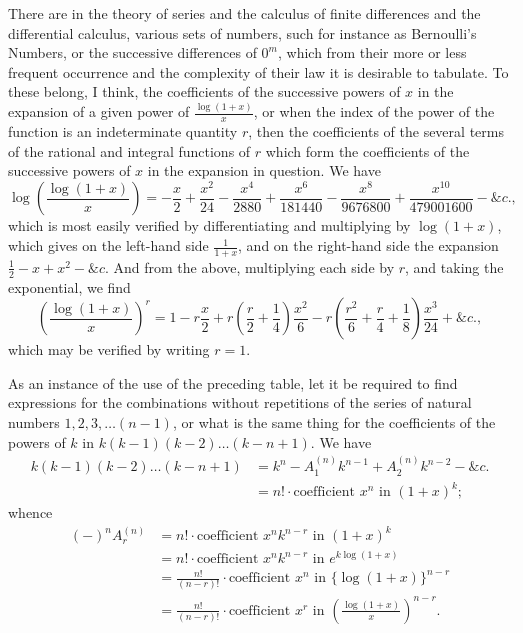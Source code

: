 \documentclass[11pt,a4paper]{article}
\theoremstyle{plain}
\begin{document}
There are in the theory of series and the calculus of finite differences and the differential calculus, various sets of numbers, such for instance as Bernoulli's Numbers, or the successive differences of $0^m$, which from their more or less frequent occurrence and the complexity of their law it is desirable to tabulate. To these belong, I think, the coefficients of the successive powers of $x$ in the expansion of a given power of $\frac{\log(1+x)}{x}$, or when the index of the power of the function is an indeterminate quantity $r$, then the coefficients of the several terms of the rational and integral functions of $r$ which form the coefficients of the successive powers of $x$ in the expansion in question. We have
\[
\log\left(\frac{\log(1+x)}{x}\right) = -\frac{x}{2} + \frac{x^2}{24} - \frac{x^4}{2880} + \frac{x^6}{181440} - \frac{x^8}{9676800} + \frac{x^{10}}{479001600} - \&c.,
\]
which is most easily verified by differentiating and multiplying by $\log(1+x)$, which gives on the left-hand side $\frac{1}{1+x}$, and on the right-hand side the expansion $\tfrac{1}{2} - x + x^2 - \&c$. And from the above, multiplying each side by $r$, and taking the exponential, we find
\[
\left(\frac{\log(1+x)}{x}\right)^r = 1 - r\frac{x}{2} + r\left(\frac{r}{2} + \frac{1}{4}\right)\frac{x^2}{6} - r\left(\frac{r^2}{6} + \frac{r}{4} + \frac{1}{8}\right)\frac{x^3}{24} + \&c.,
\]
which may be verified by writing $r = 1$.

As an instance of the use of the preceding table, let it be required to find expressions for the combinations without repetitions of the series of natural numbers $1, 2, 3, \ldots(n-1)$, or what is the same thing for the coefficients of the powers of $k$ in $k(k-1)(k-2)\ldots(k-n+1)$. We have
\begin{align*}
k(k-1)(k-2)\ldots(k-n+1) &= k^n - A_1^{(n)}k^{n-1} + A_2^{(n)}k^{n-2} - \&c.\\
&= n!\cdot\text{coefficient }x^n\text{ in }(1+x)^k;
\end{align*}
whence
\begin{align*}
(-)^nA_r^{(n)} &= n!\cdot\text{coefficient }x^nk^{n-r}\text{ in }(1+x)^k\\
&= n!\cdot\text{coefficient }x^nk^{n-r}\text{ in }e^{k\log(1+x)}\\
&= \frac{n!}{(n-r)!}\cdot\text{coefficient }x^n\text{ in }\{\log(1+x)\}^{n-r}\\
&= \frac{n!}{(n-r)!}\cdot\text{coefficient }x^r\text{ in }\left(\frac{\log(1+x)}{x}\right)^{n-r}.
\end{align*}
\end{document}
